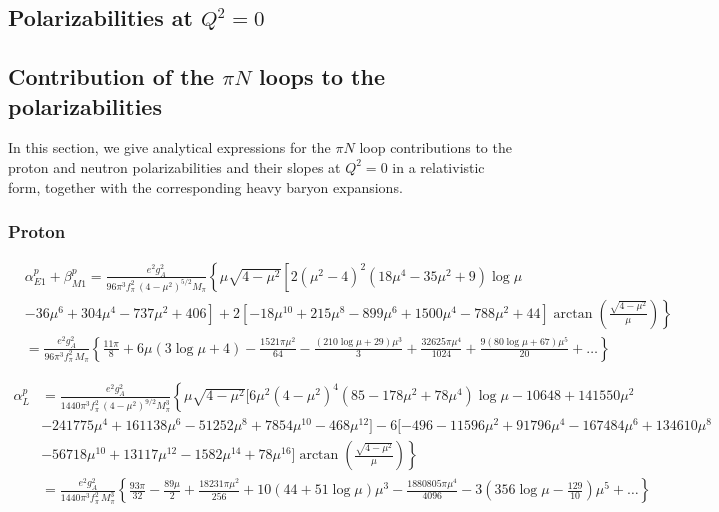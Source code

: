 \documentclass[twocolumn,prc,showpacs,nofootinbib,preprintnumbers,amsmath,amssymb,superscriptaddress]{revtex4-1}
\begin{document}
\begin{widetext}
\section{Polarizabilities at $Q^2=0$}\label{App:PolarizabilitiesAll}
\subsection{Contribution of the $\pi N$ loops to the polarizabilities}
\label{App:Polarizabilities}

In this section, we give analytical expressions for the $\pi N$ loop contributions to the proton and neutron polarizabilities and their slopes at $Q^2=0$ in a relativistic form, together with the corresponding heavy baryon expansions.

\subsubsection{Proton}

\begin{align}
&\alpha_{E1}^p+\beta_{M1}^p = \frac{e^2 g_A^2}{96\pi^3 f_\pi^2\,  (4-\mu^2)^{5/2} M_\pi} \left\{ \mu \sqrt{4-\mu^2} \left[  2 (\mu^2-4)^2(18 \mu^4 -35\mu^2 + 9) \log\mu \right.\right. \nonumber \\
& \left.\left.-36 \mu^6 + 304 \mu^4 - 737 \mu^2+ 406 \right] + 2 \left[-18\mu^{10}+ 215 \mu^8 - 899 \mu^6 + 1500 \mu^4 - 788\mu^2 + 44\right] \arctan\left( \frac{\sqrt{4-\mu^2}}{\mu} \right)\right\} \nonumber \\
& = \frac{e^2 g_A^2}{96\pi^3 f_\pi^2\, M_\pi} \left\{  \frac{11 \pi }{8} + 6 \mu (3 \log \mu +4) - \frac{1521 \pi \mu^2}{64} -\frac{ (210 \log \mu + 29)\mu^3 }{3  } + \frac{ 32625 \pi \mu^4 }{1024 }  + \frac{ 9 (80 \log \mu + 67)\mu^5 }{20  }+\dots\right\}
\end{align}


\begin{align}
\alpha_{L}^p &= \frac{e^2 g_A^2}{1440 \pi^3 f_\pi^2\,  (4-\mu^2)^{9/2} M_\pi^3}\left\{   \mu  \sqrt{4-\mu^2} [ 6 \mu^2 (4-\mu^2)^4 (85 - 178 \mu^2 + 78 \mu^4) \log\mu -10648 + 141550 \mu^2 \nonumber \right.\\
&- 241775 \mu^4 + 161138 \mu^6 -51252 \mu^8 + 7854 \mu^{10} -468 \mu^{12}  ]  - 6 [-496 - 11596  \mu^2 + 91796 \mu^4 -167484 \mu^6 + 134610 \mu^8 \nonumber \\
&\left.-56718 \mu^{10} + 13117 \mu^{12} - 1582 \mu^{14} + 78 \mu^{16}] \arctan\left( \frac{\sqrt{4-\mu^2}}{\mu}\right) \right\}\nonumber\\
&= \frac{e^2 g_A^2}{1440 \pi^3 f_\pi^2\,  M_\pi^3}\left\{ \frac{93 \pi}{32} - \frac{89 \mu}{2} + \frac{18231 \pi \mu^2}{256} +10 (44+ 51 \log\mu )\mu^3 -\frac{1880805 \pi \mu^4}{4096} - 3\left(356 \log\mu -\frac{129}{10}\right)\mu^5 +\dots  \right\}
\end{align}



\end{widetext}
\end{document}
